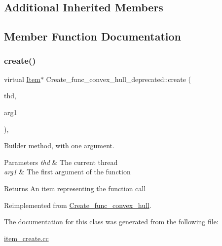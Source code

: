 \subsection*{Additional Inherited Members}


\subsection{Member Function Documentation}
\mbox{\label{classCreate__func__convex__hull__deprecated_adf24039896c580d52297e101450255f5}} 
\subsubsection{\texorpdfstring{create()}{create()}}
{\footnotesize\ttfamily virtual \mbox{\hyperlink{classItem}{Item}}$\ast$ Create\+\_\+func\+\_\+convex\+\_\+hull\+\_\+deprecated\+::create (\begin{DoxyParamCaption}\item[{T\+HD $\ast$}]{thd,  }\item[{\mbox{\hyperlink{classItem}{Item}} $\ast$}]{arg1 }\end{DoxyParamCaption})\hspace{0.3cm}{\ttfamily [inline]}, {\ttfamily [virtual]}}

Builder method, with one argument. 
\begin{DoxyParams}{Parameters}
{\em thd} & The current thread \\
\hline
{\em arg1} & The first argument of the function \\
\hline
\end{DoxyParams}
\begin{DoxyReturn}{Returns}
An item representing the function call 
\end{DoxyReturn}


Reimplemented from \mbox{\hyperlink{classCreate__func__convex__hull_ad215a1f74dc69316aa8e64e577964935}{Create\+\_\+func\+\_\+convex\+\_\+hull}}.



The documentation for this class was generated from the following file\+:\begin{DoxyCompactItemize}
\item 
\mbox{\hyperlink{item__create_8cc}{item\+\_\+create.\+cc}}\end{DoxyCompactItemize}
